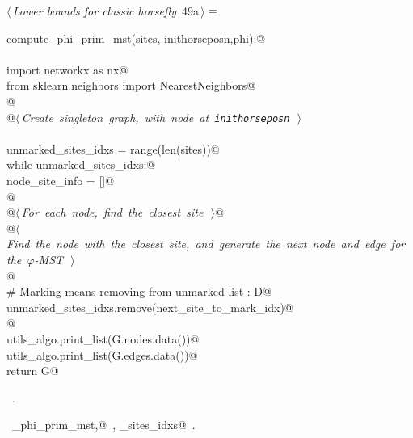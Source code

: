\documentclass[11.5pt]{report}
\begin{document}
\begin{flushleft} \small\label{scrap74}\raggedright\small
{} $\langle\,${\itshape Lower bounds for classic horsefly}\nobreak\ {\footnotesize {49a}}$\,\rangle\equiv$
\vspace{-1ex}
\begin{list}{}{} \item
\mbox{}\verb@def compute_phi_prim_mst(sites, inithorseposn,phi):@\\
\mbox{}\verb@@\\
\mbox{}\verb@     import networkx as nx@\\
\mbox{}\verb@     from sklearn.neighbors import NearestNeighbors@\\
\mbox{}\verb@     @\\
\mbox{}\verb@     @\hbox{$\langle\,${\itshape Create singleton graph, with node at \verb|inithorseposn|}\nobreak\ {\footnotesize {}}$\,\rangle$}\verb@@\\
\mbox{}\verb@@\\
\mbox{}\verb@     unmarked_sites_idxs = range(len(sites))@\\
\mbox{}\verb@     while unmarked_sites_idxs:@\\
\mbox{}\verb@          node_site_info = []@\\
\mbox{}\verb@          @\\
\mbox{}\verb@          @\hbox{$\langle\,${\itshape For each node, find the closest site}\nobreak\ {\footnotesize {}}$\,\rangle$}\verb@    @\\
\mbox{}\verb@          @\hbox{$\langle\,${\itshape Find the node with the closest site, and generate the next node and edge for the $\varphi$-MST}\nobreak\ {\footnotesize {}}$\,\rangle$}\verb@@\\
\mbox{}\verb@          @\\
\mbox{}\verb@          # Marking means removing from unmarked list :-D@\\
\mbox{}\verb@          unmarked_sites_idxs.remove(next_site_to_mark_idx)@\\
\mbox{}\verb@          @\\
\mbox{}\verb@     utils_algo.print_list(G.nodes.data())@\\
\mbox{}\verb@     utils_algo.print_list(G.edges.data())@\\
\mbox{}\verb@     return G@\\
\mbox{}\verb@@{\NWsep}
\end{list}
\vspace{-1.5ex}
\footnotesize
\begin{list}{}{\setlength{\itemsep}{-\parsep}\setlength{\itemindent}{-\leftmargin}}
\item \NWtxtMacroRefIn\ .
\item \NWtxtIdentsDefed\nobreak\  \verb@compute_phi_prim_mst,@\nobreak\ \NWtxtIdentsNotUsed, \verb@unmarked_sites_idxs@\nobreak\ .
\item{}
\end{list}
\vspace{4ex}
\end{flushleft}
\end{document}

